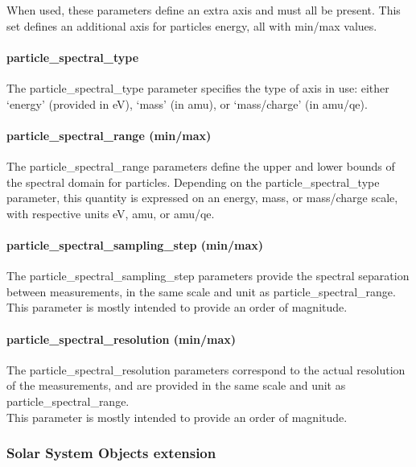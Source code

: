 \documentclass[11pt,a4paper]{ivoa}
\begin{document}
When used, these parameters define an extra axis and must all be present.
This set defines an additional axis for particles energy,
all with min/max values.

\paragraph{particle\_spectral\_type}

The particle\_spectral\_type parameter specifies the type of axis in use:
either `energy' (provided in eV), `mass' (in amu), or `mass/charge'
(in amu/qe).

\paragraph{particle\_spectral\_range (min/max)}

The particle\_spectral\_range parameters define the upper and
lower bounds of the spectral domain for particles. Depending on the
particle\_spectral\_type parameter, this quantity is expressed on an
energy, mass, or mass/charge scale, with respective units eV, amu,
or amu/qe.

\paragraph{particle\_spectral\_sampling\_step (min/max)}

The particle\_spectral\_sampling\_step parameters provide the
spectral separation between measurements, in the same scale and unit as
particle\_spectral\_range.\\
This parameter is mostly intended to provide an order of magnitude.

\paragraph{particle\_spectral\_resolution (min/max)}

The particle\_spectral\_resolution parameters correspond to the actual
resolution of the measurements, and are provided in the same scale and
unit as particle\_spectral\_range. \\
This parameter is mostly intended to provide an order of magnitude.

\subsubsection{Solar System Objects extension}
\end{document}
